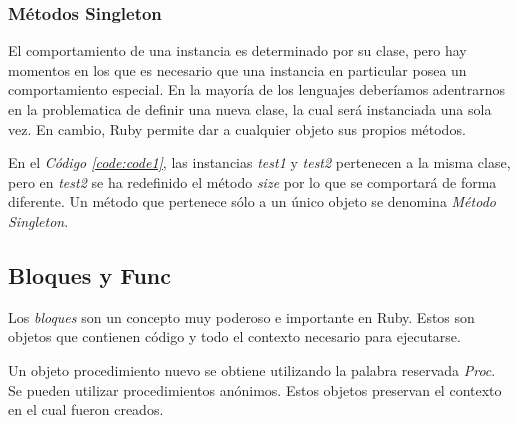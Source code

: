 \documentclass{article}
\newcommand{\refcode}[1]{\textit{Código \ref{#1}}}
\begin{document}
 

 

 
\bigskip



\subsubsection{Métodos Singleton}

	El comportamiento de una instancia es determinado por su clase, pero hay momentos en los que es necesario que una instancia en particular posea un comportamiento especial. En la mayoría de los lenguajes deberíamos adentrarnos en la problematica de definir una nueva clase, la cual será instanciada una sola vez. En cambio, Ruby permite dar a cualquier objeto sus propios métodos.

 
\bigskip

	En el \refcode{code:code1}, las instancias \textit{test1} y \textit{test2} pertenecen a la misma clase, pero en \textit{test2} se ha redefinido el método \textit{size} por lo que se comportará de forma diferente. Un método que pertenece sólo a un único objeto se denomina \textit{Método Singleton}.
\bigskip



\subsection{Bloques y Func}

Los \textit{bloques} son un concepto muy poderoso e importante en Ruby. Estos son objetos que contienen código y todo el contexto necesario para ejecutarse.

 
\bigskip

Un objeto procedimiento nuevo se obtiene utilizando la palabra reservada \textit{Proc}. Se pueden utilizar procedimientos anónimos. Estos objetos preservan el contexto en el cual fueron creados.
\end{document}

